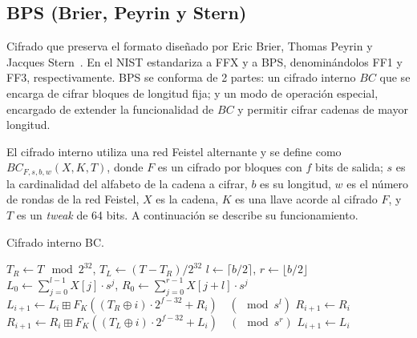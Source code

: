 %
%

\subsection{BPS (Brier, Peyrin y Stern)}

Cifrado que preserva el formato diseñado por Eric Brier, Thomas Peyrin y
Jacques Stern~\cite{bps}. En \cite{nist_fpe} el NIST estandariza a FFX y a
BPS, denominándolos FF1 y FF3, respectivamente. BPS se conforma de 2 partes: un
cifrado interno $BC$ que se encarga de cifrar bloques de longitud fija; y un modo
de operación especial, encargado de extender la funcionalidad de $BC$ y permitir
cifrar cadenas de mayor longitud.

El cifrado interno utiliza una red Feistel alternante y se define como
$BC_{F,s,b,w}(X,K,T)$, donde $F$ es un cifrado por bloques con $f$ bits de
salida; $s$ es la cardinalidad del alfabeto de la cadena a cifrar, $b$ es su
longitud, $w$ es el número de rondas de la red Feistel, $X$ es la cadena, $K$ es
una llave acorde al cifrado $F$, y $T$ es un \textit{tweak} de 64 bits. A
continuación se describe su funcionamiento.

\begin{algorithm}
  \caption{\label{proceso_bc} Cifrado interno BC.}
  \begin{algorithmic}[1]
      \State $ T_R \gets T \mod 2^{32} $,
        $ T_L \gets (T - T_R) / 2^{32} $
      \State $ l \gets \lceil b/2 \rceil $,
        $ r \gets \lfloor b/2 \rfloor $
      \State $ L_0 \gets \sum_{j=0}^{l-1} X[j] \cdot s^j $,
        $ R_0 \gets \sum_{j=0}^{r-1} X[j+l] \cdot s^j $
          \State $ L_{i+1} \gets L_i \boxplus F_K((T_R \oplus i)
            \cdot 2^{f-32} + R_i)\quad (\mod s^l) $
          \State $ R_{i+1} \gets R_i $
        \Else
          \State $ R_{i+1} \gets R_i \boxplus F_K((T_L \oplus i)
            \cdot 2^{f-32} + L_i)\quad (\mod s^r) $
          \State $ L_{i+1} \gets L_i $
        \EndIf
      \EndFor
      \State {}
    \EndFunction
  \end{algorithmic}
\end{algorithm}

